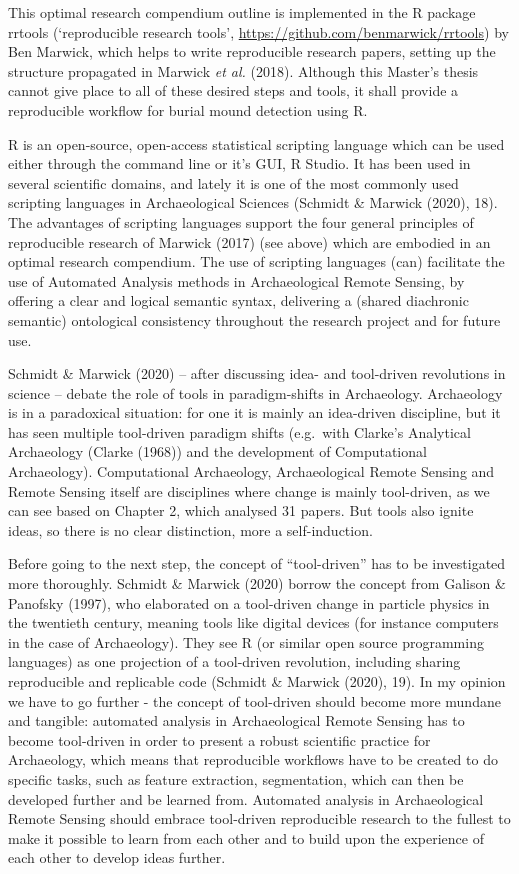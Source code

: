 \documentclass[
  12pt,
]{article}
\begin{document}
This optimal research compendium outline is implemented in the R package rrtools (`reproducible research tools', \url{https://github.com/benmarwick/rrtools}) by Ben Marwick, which helps to write reproducible research papers, setting up the structure propagated in Marwick \emph{et al.} (2018). Although this Master's thesis cannot give place to all of these desired steps and tools, it shall provide a reproducible workflow for burial mound detection using R.

R is an open-source, open-access statistical scripting language which can be used either through the command line or it's GUI, R Studio. It has been used in several scientific domains, and lately it is one of the most commonly used scripting languages in Archaeological Sciences (Schmidt \& Marwick (2020), 18). The advantages of scripting languages support the four general principles of reproducible research of Marwick (2017) (see above) which are embodied in an optimal research compendium. The use of scripting languages (can) facilitate the use of Automated Analysis methods in Archaeological Remote Sensing, by offering a clear and logical semantic syntax, delivering a (shared diachronic semantic) ontological consistency throughout the research project and for future use.

Schmidt \& Marwick (2020) -- after discussing idea- and tool-driven revolutions in science -- debate the role of tools in paradigm-shifts in Archaeology. Archaeology is in a paradoxical situation: for one it is mainly an idea-driven discipline, but it has seen multiple tool-driven paradigm shifts (e.g.~with Clarke's Analytical Archaeology (Clarke (1968)) and the development of Computational Archaeology). Computational Archaeology, Archaeological Remote Sensing and Remote Sensing itself are disciplines where change is mainly tool-driven, as we can see based on Chapter 2, which analysed 31 papers. But tools also ignite ideas, so there is no clear distinction, more a self-induction.

Before going to the next step, the concept of ``tool-driven'' has to be investigated more thoroughly. Schmidt \& Marwick (2020) borrow the concept from Galison \& Panofsky (1997), who elaborated on a tool-driven change in particle physics in the twentieth century, meaning tools like digital devices (for instance computers in the case of Archaeology). They see R (or similar open source programming languages) as one projection of a tool-driven revolution, including sharing reproducible and replicable code (Schmidt \& Marwick (2020), 19). In my opinion we have to go further - the concept of tool-driven should become more mundane and tangible: automated analysis in Archaeological Remote Sensing has to become tool-driven in order to present a robust scientific practice for Archaeology, which means that reproducible workflows have to be created to do specific tasks, such as feature extraction, segmentation, which can then be developed further and be learned from. Automated analysis in Archaeological Remote Sensing should embrace tool-driven reproducible research to the fullest to make it possible to learn from each other and to build upon the experience of each other to develop ideas further.
\end{document}
